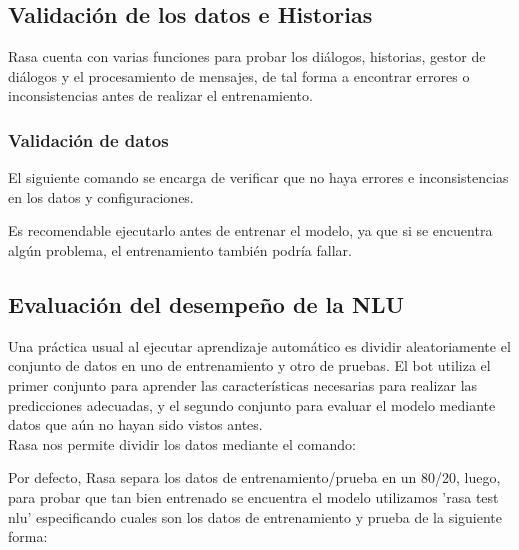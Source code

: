 \subsection{Validación de los datos e Historias}
Rasa cuenta con varias funciones para probar los diálogos, historias, gestor de diálogos y el
procesamiento de mensajes, de tal forma a encontrar errores o inconsistencias antes de realizar el
entrenamiento.

\subsubsection{Validación de datos}
El siguiente comando se encarga de verificar que no haya errores e inconsistencias en los datos y
configuraciones.

\begin{center}
\end{center}

Es recomendable ejecutarlo antes de entrenar el modelo, ya que si se encuentra algún problema, el
entrenamiento también podría fallar.

\subsection{Evaluación del desempeño de la NLU}
Una práctica usual al ejecutar aprendizaje automático es dividir aleatoriamente el conjunto de
datos en uno de entrenamiento y otro de pruebas. El bot utiliza el primer conjunto para aprender
las características necesarias para realizar las predicciones adecuadas, y el segundo conjunto para
evaluar el modelo mediante datos que aún no hayan sido vistos antes.\\
Rasa nos permite dividir los datos mediante el comando:

\begin{center}
\end{center}

Por defecto, Rasa separa los datos de entrenamiento/prueba en un 80/20, luego, para probar que tan
bien entrenado se encuentra el modelo utilizamos 'rasa test nlu' especificando cuales son los datos
de entrenamiento y prueba de la siguiente forma:\\

\begin{center}
\end{center}

